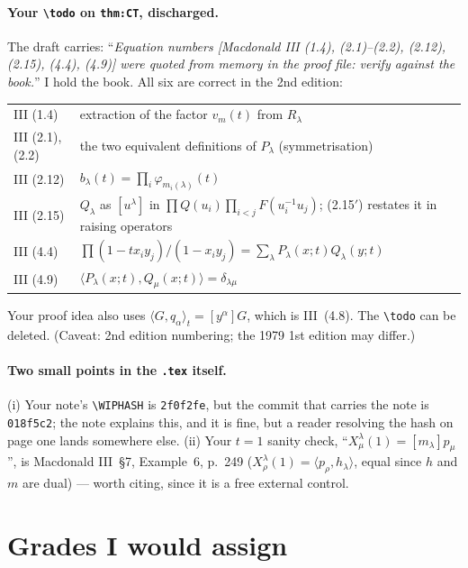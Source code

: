 \documentclass[11pt]{article}
\theoremstyle{plain}
\theoremstyle{definition}
\newcommand{\lam}{\lambda}
\begin{document}
\paragraph{Your \texttt{\textbackslash todo} on \texttt{thm:CT}, discharged.} The draft carries:
``\emph{Equation numbers [Macdonald III (1.4), (2.1)--(2.2), (2.12), (2.15), (4.4), (4.9)] were
quoted from memory in the proof file: verify against the book.}'' I hold the book. All six are
correct in the 2nd edition:
\begin{center}\small
\begin{tabular}{@{}ll@{}}
\toprule
III (1.4) & extraction of the factor $v_m(t)$ from $R_\lam$ \\
III (2.1), (2.2) & the two equivalent definitions of $P_\lam$ (symmetrisation) \\
III (2.12) & $b_\lam(t)=\prod_i\varphi_{m_i(\lam)}(t)$ \\
III (2.15) & $Q_\lam$ as $[u^\lam]$ in $\prod Q(u_i)\prod_{i<j}F(u_i^{-1}u_j)$;
   (2.15$'$) restates it in raising operators \\
III (4.4) & $\prod(1-tx_iy_j)/(1-x_iy_j)=\sum_\lam P_\lam(x;t)Q_\lam(y;t)$ \\
III (4.9) & $\langle P_\lam(x;t),Q_\mu(x;t)\rangle=\delta_{\lam\mu}$ \\
\bottomrule
\end{tabular}
\end{center}
Your proof idea also uses $\langle G,q_\alpha\rangle_t=[y^\alpha]G$, which is III~(4.8). The
\texttt{\textbackslash todo} can be deleted. (Caveat: 2nd edition numbering; the 1979 1st edition
may differ.)

\paragraph{Two small points in the \texttt{.tex} itself.} (i) Your note's
\texttt{\textbackslash WIPHASH} is \texttt{2f0f2fe}, but the commit that carries the note is
\texttt{018f5c2}; the note explains this, and it is fine, but a reader resolving the hash on page
one lands somewhere else. (ii) Your $t=1$ sanity check, ``$X^\lam_\mu(1)=[m_\lam]p_\mu$'', is
Macdonald III~\S7, Example~6, p.~249 ($X^\lam_\rho(1)=\langle p_\rho,h_\lam\rangle$, equal since
$h$ and $m$ are dual) --- worth citing, since it is a free external control.

\section{Grades I would assign}
\end{document}
